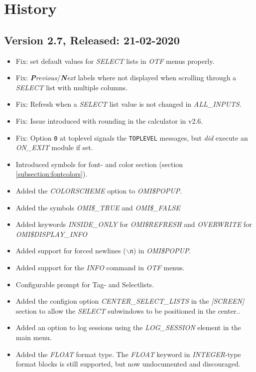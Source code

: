 \documentclass[a4paper]{book}
\begin{document}
\chapter{History}

\section*{Version 2.7, Released: 21-02-2020}

\begin{itemize}
\item Fix: set default values for \textsl{SELECT} lists in \textsl{OTF} menus properly.
\item Fix: \textsl{\textbf{P}revious}/\textsl{\textbf{N}ext} labels where not displayed when scrolling through a \textsl{SELECT} list with multiple columns.
\item Fix: Refresh when a \textsl{SELECT} list value is not changed in \textsl{ALL{\_}INPUTS}.
\item Fix: Issue introduced with rounding in the calculator in v2.6.
\item Fix: Option \texttt{0} at toplevel signals the \texttt{TOPLEVEL} messages, but \textit{did} execute an \textsl{ON{\_}EXIT} module if set.
\item Introduced symbols for font- and color section (section \ref{subsection:fontcolors}).
\item Added the \textsl{COLORSCHEME} option to \textsl{OMI{\$}POPUP}.
\item Added the symbols \textsl{OMI{\$}{\_}TRUE} and \textsl{OMI{\$}{\_}FALSE}
\item Added keywords \textsl{INSIDE{\_}ONLY} for \textsl{OMI{\$}REFRESH} and \textsl{OVERWRITE} for \textsl{OMI{\$}DISPLAY{\_}INFO}
\item Added support for forced newlines (\texttt{\ensuremath{\backslash}n}) in \textsl{OMI{\$}POPUP}.
\item Added support for the \textsl{INFO} command in \textsl{OTF} menus.
\item Configurable prompt for Tag- and Selectlists.
\item Added the configion option \textsl{CENTER{\_}SELECT{\_}LISTS} in the \textsl{[SCREEN]} section to allow the \textsl{SELECT} subwindows to be positioned in the center..
\item Added an option to log sessions using the \textsl{LOG{\_}SESSION} element in the main menu.
\item Added the \textsl{FLOAT} format type. The \textsl{FLOAT} keyword in \textsl{INTEGER}-type format blocks is still supported, but now undocumented and discouraged.
\end{itemize}
\end{document}
